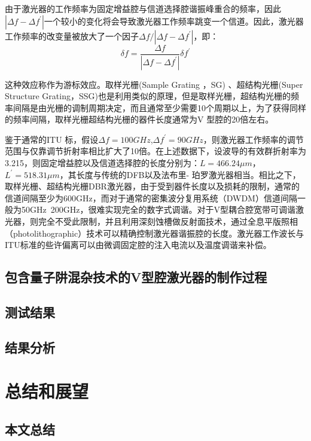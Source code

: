 \documentclass{ZJUthesis}
\begin{document}
由于激光器的工作频率为固定增益腔与信道选择腔谐振峰重合的频率，因此$|\Delta f-\Delta f^\prime|$一个较小的变化将会导致激光器工作频率跳变一个信道。因此，激光器工作频率的改变量被放大了一个因子$\Delta f/|\Delta f-\Delta f^\prime|$，即：
\begin{equation}
  \delta f = \frac{\Delta f}{|\Delta f-\Delta f^\prime|} \delta f^\prime
\end{equation}

这种效应称作为游标效应。取样光栅(Sample Grating ，SG) 、超结构光栅(Super Structure Grating，SSG)也是利用类似的原理，但是取样光栅，超结构光栅的频率间隔是由光栅的调制周期决定，而且通常至少需要10个周期以上，为了获得同样的频率间隔，取样光栅超结构光栅的器件长度通常为V 型腔的20倍左右。

鉴于通常的ITU 标，假设$\Delta f=100GHz$,$\Delta f^\prime=90GHz$，则激光器工作频率的调节范围与仅靠调节折射率相比扩大了10倍。在上述数据下，设波导的有效群折射率为3.215，则固定增益腔以及信道选择腔的长度分别为：$L=466.24\mu m$，$L^\prime=518.31\mu m$，其长度与传统的DFB以及法布里- 珀罗激光器相当。相比之下，取样光栅、超结构光栅DBR激光器，由于受到器件长度以及损耗的限制，通常的信道间隔至少为600GHz，而对于通常的密集波分复用系统（DWDM）信道间隔一般为50GHz~200GHz，很难实现完全的数字式调谐。对于V型耦合腔宽带可调谐激光器，则完全不受此限制，并且利用深刻蚀槽做反射面技术，通过全息平版照相（photolithographic）技术可以精确控制激光器谐振腔的长度。激光器工作波长与ITU标准的些许偏离可以由微调固定腔的注入电流以及温度调谐来补偿。

\section{包含量子阱混杂技术的V型腔激光器的制作过程}

\section{测试结果}

\section{结果分析}

\chapter{总结和展望}

\section{本文总结}
\end{document}

